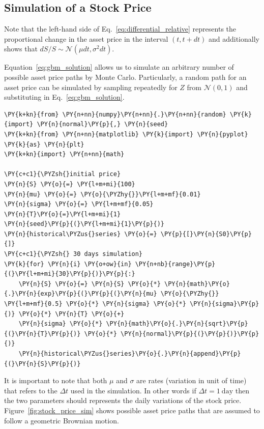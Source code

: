 \subsection{Simulation of a Stock Price}
Note that the left-hand side of Eq.~\ref{eq:differential_relative} represents the 
proportional change in the asset price in the interval $(t, t + dt)$ and 
additionally shows that $dS/S ∼ \mathcal{N}(\mu dt, \sigma^2 dt)$. 

Equation~\ref{eq:gbm_solution} allows us to simulate an arbitrary number of possible 
asset price paths by Monte Carlo. Particularly, a random path for an asset 
price can be simulated by sampling repeatedly for $Z$ from $\mathcal{N}(0,1)$ and 
substituting in Eq.~\ref{eq:gbm_solution}. 

\begin{codebox}
\begin{Verbatim}[commandchars=\\\{\}]
\PY{k+kn}{from} \PY{n+nn}{numpy}\PY{n+nn}{.}\PY{n+nn}{random} \PY{k}{import} \PY{n}{normal}\PY{p}{,} \PY{n}{seed} 
\PY{k+kn}{from} \PY{n+nn}{matplotlib} \PY{k}{import} \PY{n}{pyplot} \PY{k}{as} \PY{n}{plt} 
\PY{k+kn}{import} \PY{n+nn}{math}
	
\PY{c+c1}{\PYZsh{}initial price}
\PY{n}{S} \PY{o}{=} \PY{l+m+mi}{100}
\PY{n}{mu} \PY{o}{=} \PY{o}{\PYZhy{}}\PY{l+m+mf}{0.01} 
\PY{n}{sigma} \PY{o}{=} \PY{l+m+mf}{0.05} 
\PY{n}{T}\PY{o}{=}\PY{l+m+mi}{1}
\PY{n}{seed}\PY{p}{(}\PY{l+m+mi}{1}\PY{p}{)} 
\PY{n}{historical\PYZus{}series} \PY{o}{=} \PY{p}{[}\PY{n}{S0}\PY{p}{]}
\PY{c+c1}{\PYZsh{} 30 days simulation}
\PY{k}{for} \PY{n}{i} \PY{o+ow}{in} \PY{n+nb}{range}\PY{p}{(}\PY{l+m+mi}{30}\PY{p}{)}\PY{p}{:}
    \PY{n}{S} \PY{o}{=} \PY{n}{S} \PY{o}{*} \PY{n}{math}\PY{o}{.}\PY{n}{exp}\PY{p}{(}\PY{p}{(}\PY{n}{mu} \PY{o}{\PYZhy{}} \PY{l+m+mf}{0.5} \PY{o}{*} \PY{n}{sigma} \PY{o}{*} \PY{n}{sigma}\PY{p}{)} \PY{o}{*} \PY{n}{T} \PY{o}{+}
	\PY{n}{sigma} \PY{o}{*} \PY{n}{math}\PY{o}{.}\PY{n}{sqrt}\PY{p}{(}\PY{n}{T}\PY{p}{)} \PY{o}{*} \PY{n}{normal}\PY{p}{(}\PY{p}{)}\PY{p}{)}
	\PY{n}{historical\PYZus{}series}\PY{o}{.}\PY{n}{append}\PY{p}{(}\PY{n}{S}\PY{p}{)}
\end{Verbatim}
\end{codebox}
It is important to note that both $\mu$ and $\sigma$ are rates (variation in unit of time) 
that refers to the $\Delta t$ used in the simulation. In other words if $\Delta t = 1~\textrm{day}$
then the two parameters should represents the daily variations of the stock price.
Figure~\ref{fig:stock_price_sim} shows possible asset price paths that are assumed to
follow a geometric Brownian motion. 

